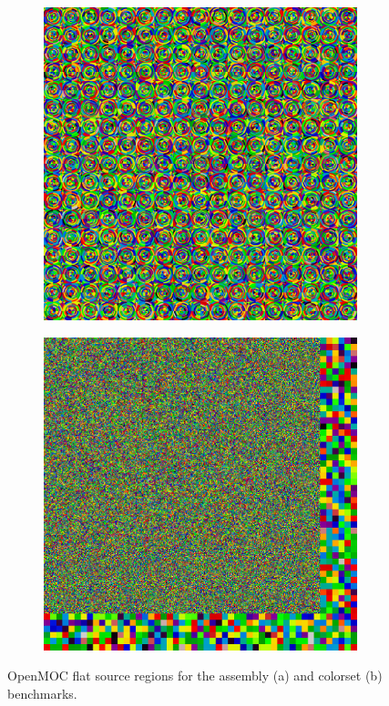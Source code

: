 \begin{figure}[h!]
\centering
\begin{subfigure}{0.42\textwidth}
  \centering
  \includegraphics[width=0.8\linewidth]{figures/assembly/fsrs}
  \caption{}
  \label{fig:benchmarks-assm-fsrs}
\end{subfigure}%
\begin{subfigure}{0.42\textwidth}
  \centering
  \includegraphics[width=0.8\linewidth]{figures/colorset/fsrs}
  \caption{}
  \label{fig:benchmarks-colorset-fsrs}
\end{subfigure}
\caption{OpenMOC flat source regions for the assembly (a) and colorset (b) benchmarks.}
\label{fig:benchmarks-fsrs}
\end{figure}

